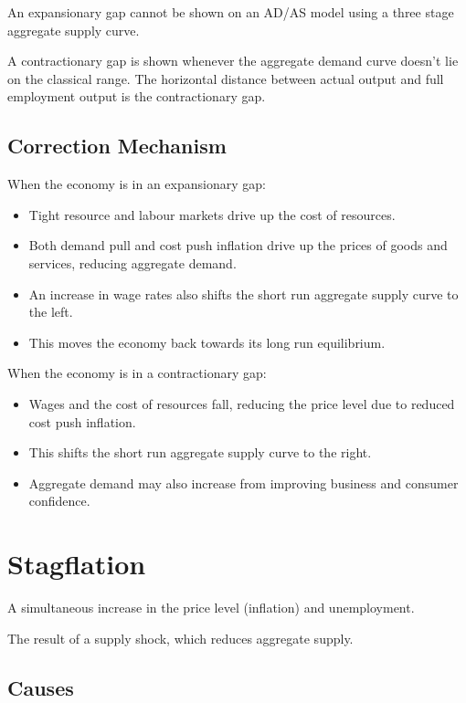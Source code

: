 \documentclass[a4paper,11pt]{article}
\begin{document}

An expansionary gap cannot be shown on an AD/AS model using a three stage
aggregate supply curve.

A contractionary gap is shown whenever the aggregate demand curve doesn't lie on
the classical range. The horizontal distance between actual output and full
employment output is the contractionary gap.


\subsection{Correction Mechanism}

When the economy is in an expansionary gap:

\begin{itemize}
\item Tight resource and labour markets drive up the cost of resources.
\item Both demand pull and cost push inflation drive up the prices of goods and
	services, reducing aggregate demand.
\item An increase in wage rates also shifts the short run aggregate supply curve
	to the left.
\item This moves the economy back towards its long run equilibrium.
\end{itemize}

When the economy is in a contractionary gap:

\begin{itemize}
\item Wages and the cost of resources fall, reducing the price level due to
	reduced cost push inflation.
\item This shifts the short run aggregate supply curve to the right.
\item Aggregate demand may also increase from improving business and consumer
	confidence.
\end{itemize}




\section{Stagflation}

A simultaneous increase in the price level (inflation) and unemployment.

The result of a supply shock, which reduces aggregate supply.


\subsection{Causes}
\end{document}
